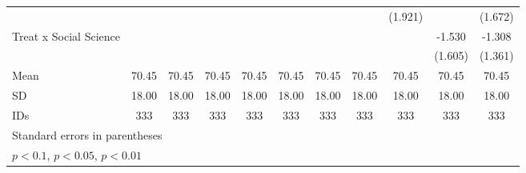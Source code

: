 \begin{table}[htbp]
\begin{tabular}{l*{10}{c}}
                                &                  &                  &                  &                  &                  &                  &                  &  (1.921)         &                  &  (1.672)         \\
Treat x Social Science          &                  &                  &                  &                  &                  &                  &                  &                  &   -1.530         &   -1.308         \\
                                &                  &                  &                  &                  &                  &                  &                  &                  &  (1.605)         &  (1.361)         \\
\hline
Mean                            &    70.45         &    70.45         &    70.45         &    70.45         &    70.45         &    70.45         &    70.45         &    70.45         &    70.45         &    70.45         \\
SD                              &    18.00         &    18.00         &    18.00         &    18.00         &    18.00         &    18.00         &    18.00         &    18.00         &    18.00         &    18.00         \\
IDs                             &      333         &      333         &      333         &      333         &      333         &      333         &      333         &      333         &      333         &      333         \\
\hline\hline
\multicolumn{11}{l}{\footnotesize Standard errors in parentheses}\\
\multicolumn{11}{l}{\footnotesize \sym{*} \(p<0.1\), \sym{**} \(p<0.05\), \sym{***} \(p<0.01\)}\\
\end{tabular}
\end{table}
